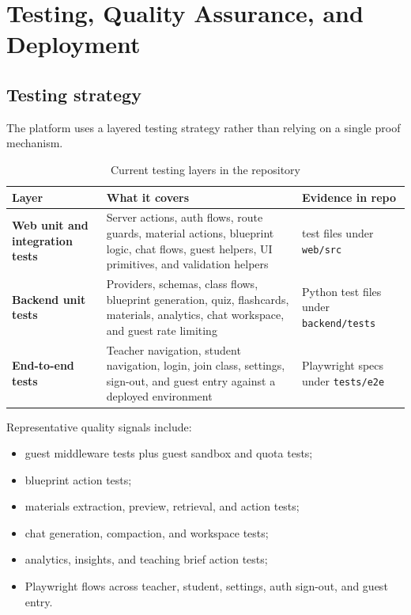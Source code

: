 \documentclass[11pt,a4paper]{article}
\begin{document}
\section{Testing, Quality Assurance, and Deployment}

\subsection{Testing strategy}

The platform uses a layered testing strategy rather than relying on a single proof mechanism.

\begin{table}[H]
\centering
\caption{Current testing layers in the repository}
\begin{tabularx}{\textwidth}{>{\bfseries}p{3.3cm}X>{\raggedright\arraybackslash}p{2.7cm}}
\toprule
Layer & What it covers & Evidence in repo \\
\midrule
Web unit and integration tests & Server actions, auth flows, route guards, material actions, blueprint logic, chat flows, guest helpers, UI primitives, and validation helpers & 60 test files under \texttt{web/src} \\
Backend unit tests & Providers, schemas, class flows, blueprint generation, quiz, flashcards, materials, analytics, chat workspace, and guest rate limiting & 17 Python test files under \texttt{backend/tests} \\
End-to-end tests & Teacher navigation, student navigation, login, join class, settings, sign-out, and guest entry against a deployed environment & 9 Playwright specs under \texttt{tests/e2e} \\
\bottomrule
\end{tabularx}
\end{table}

Representative quality signals include:
\begin{itemize}
  \item guest middleware tests plus guest sandbox and quota tests;
  \item blueprint action tests;
  \item materials extraction, preview, retrieval, and action tests;
  \item chat generation, compaction, and workspace tests;
  \item analytics, insights, and teaching brief action tests;
  \item Playwright flows across teacher, student, settings, auth sign-out, and guest entry.
\end{itemize}
\end{document}
